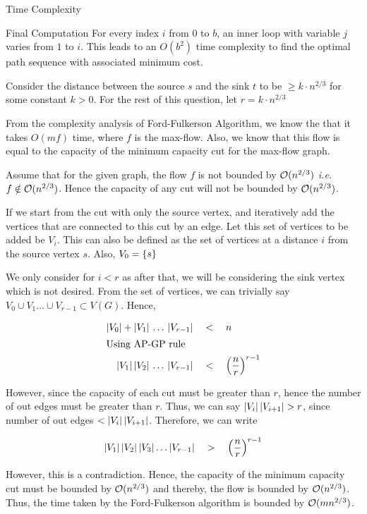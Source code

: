 \documentclass{article}
\begin{document}
\begin{question}
\begin{qsection}{Time Complexity}
\begin{qsubsection}{Final Computation}
			For every index $i$ from 0 to $b$, an inner loop with variable $j$ varies from $1$ to $i$. This leads to an $O(b^2)$ time complexity to find the optimal path sequence with associated minimum cost.

		\end{qsubsection}
		
	\end{qsection}

\end{question}

\begin{question}

	Consider the distance between the source $s$ and the sink $t$ to be $\ge k \cdot n^{2/3}$ for some constant $k > 0$. For the rest of this question, let $r = k \cdot n^{2/3}$ \br%

	From the complexity analysis of Ford-Fulkerson Algorithm, we know the that it takes $O(mf)$ time, where $f$ is the max-flow. Also, we know that this flow is equal to the capacity of the minimum capacity cut for the max-flow graph. \br%

	Assume that for the given graph, the flow $f$ is not bounded by $\mathcal{O}(n^{2/3})$ \textit{i.e.} $f \notin \mathcal{O}(n^{2/3})$. Hence the capacity of any cut will not be bounded by $\mathcal{O}(n^{2/3})$. \br%

	If we start from the cut with only the source vertex, and iteratively add the vertices that are connected to this cut by an edge. Let this set of vertices to be added be $V_i$. This can also be defined as the set of vertices at a distance $i$ from the source vertex $s$. Also, $V_0 = \left\{ s \right\}$ \br%

	We only consider for $i < r$ as after that, we will be considering the sink vertex which is not desired. From the set of vertices, we can trivially say $V_0 \cup V_1 \dots \cup V_{r - 1} \subset V(G)$. Hence,

	\begin{align*}
		\left| {V_0} \right| + \left| {V_1} \right| \,\dots\, \left| {V_{r - 1}} \right|	&\quad < \quad	n \\
		\shortintertext{Using AP-GP rule}
		\left| {V_1} \right| \left| {V_2} \right| \,\dots\, \left| {V_{r - 1}} \right|	&\quad < \quad	\left( \frac{n}{r} \right)^{r - 1}
	\end{align*}

	However, since the capacity of each cut must be greater than $r$, hence the number of out edges must be greater than $r$. Thus, we can say $\left| {V_i} \right| \left| {V_{i + 1}} \right| > r$, since number of out edges $< \left| {V_i} \right| \left| {V_{i + 1}} \right|$. Therefore, we can write

	\begin{align*}
		\left| {V_1} \right| \left| {V_2} \right| \left| {V_3} \right| \dots \left| {V_{r - 1}} \right|	\quad > \quad	\left( \frac{n}{r} \right)^{r - 1}
	\end{align*}

	However, this is a contradiction. Hence, the capacity of the minimum capacity cut must be bounded by $\mathcal{O}(n^{2/3})$ and thereby, the flow is bounded by $\mathcal{O}(n^{2/3})$. Thus, the time taken by the Ford-Fulkerson algorithm is bounded by $\mathcal{O}(mn^{2/3})$.

\end{question}
\end{document}
